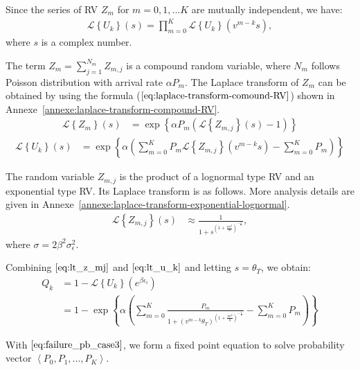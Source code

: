 Since the series of RV $Z_m$ for $m=0,1,...K$ are mutually independent, we have:
\begin{align*}
	\mathcal{L} \left\lbrace U_k \right\rbrace \left( s \right)= \prod_{m=0}^{K} \mathcal{L} \left\lbrace U_k \right\rbrace \left( v^{m-k} s \right),
\end{align*}
where $s$ is a complex number.

The term $Z_m = \sum_{j=1}^{N_m} Z_{m,j}$ is a compound random variable, where $N_m$ follows Poisson distribution with arrival rate $\alpha P_m$. The Laplace transform of $Z_m$ can be obtained by using the formula ($\ref{eq:laplace-transform-comound-RV}$) shown in Annexe~\ref{annexe:laplace-transform-compound-RV}.
\begin{align*}
	\mathcal{L} \left\lbrace Z_m \right\rbrace \left( s \right)&= \exp\left\lbrace \alpha P_m \left( \mathcal{L} \left\lbrace Z_{m,j} \right\rbrace \left( s \right)  - 1\right) \right\rbrace 
\end{align*}
\begin{align}
	\label{eq:lt_u_k}
	\mathcal{L} \left\lbrace U_k \right\rbrace \left( s \right) &= \exp\left\lbrace 
	\alpha\left( \sum_{m=0}^{K}P_m \mathcal{L} \left\lbrace Z_{m,j} \right\rbrace \left( v^{m-k} s \right) - \sum_{m=0}^{K}P_m\right) 
	\right\rbrace
\end{align}

The random variable $Z_{m,j}$ is the product of a lognormal type RV and an exponential type RV. Its Laplace transform is as follows. More analysis details are given in Annexe~\ref{annexe:laplace-transform-exponential-lognormal}.
\begin{align}
	\label{eq:lt_z_mj}
	\mathcal{L} \left\lbrace Z_{m,j} \right\rbrace \left( s \right)
	&\approx  \frac{1}{1 + s ^{\left( 1 +\frac{\pi \sigma^2}{8} \right)^{-\frac{1}{2}}}},
\end{align}
where $\sigma = 2\beta^2\sigma_{\epsilon}^2$.

Combining $\eqref{eq:lt_z_mj}$ and $\eqref{eq:lt_u_k}$ and letting $s = \theta_{T}$, we obtain:
\begin{align}
	\label{eq:failure_pb_case3}
	Q_{k}  &=  1- \mathcal{L} \left\lbrace U_k \right\rbrace \left( e^{\beta\epsilon_i} \right) \nonumber\\
	&= 1- \exp\left\lbrace \alpha\left( \sum_{m=0}^{K} \frac{P_m}{1 + \left( v^{m-k} \theta_{T} \right) ^{\left( 1 +\frac{\pi \sigma^2}{8} \right)^{-\frac{1}{2}}}} -\sum_{m=0}^{K}P_m \right) \right\rbrace 
\end{align}

With $\eqref{eq:failure_pb_case3}$, we form a fixed point equation to solve probability vector $\left\langle P_0, P_1, ..., P_K\right\rangle$.

